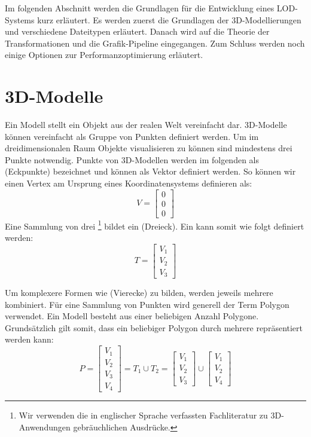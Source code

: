 
Im folgenden Abschnitt werden die Grundlagen für die Entwicklung eines LOD-Systems kurz erläutert.
Es werden zuerst die Grundlagen der 3D-Modellierungen und verschiedene Dateitypen erläutert. Danach wird auf die Theorie der Transformationen und die Grafik-Pipeline eingegangen. Zum Schluss werden noch einige Optionen zur Performanzoptimierung erläutert.

\section{3D-Modelle}
Ein Modell stellt ein Objekt aus der realen Welt vereinfacht dar.
3D-Modelle können vereinfacht als Gruppe von Punkten definiert werden.
Um im dreidimensionalen Raum Objekte visualisieren zu können sind mindestens drei Punkte notwendig.
Punkte von 3D-Modellen werden im folgenden als  (Eckpunkte) bezeichnet und können als Vektor definiert werden.
So können wir einen Vertex am Ursprung eines Koordinatensystems definieren als:
$$ V =
\begin{bmatrix}
  0 \\
  0 \\
  0
\end{bmatrix}
$$
Eine Sammlung von drei \footnote{Wir verwenden die in englischer Sprache verfassten Fachliteratur zu 3D-Anwendungen gebräuchlichen Ausdrücke.} bildet ein  (Dreieck). Ein  kann somit wie folgt definiert werden:
$$ T =
\begin{bmatrix}
  V_1 \\
  V_2 \\
  V_3
\end{bmatrix}
$$

Um komplexere Formen wie  (Vierecke) zu bilden, werden jeweils mehrere  kombiniert. Für eine Sammlung von Punkten wird generell der Term Polygon verwendet.
Ein Modell besteht aus einer beliebigen Anzahl Polygone.
Grundsätzlich gilt somit, dass ein beliebiger Polygon durch mehrere  repräsentiert werden kann:
$$ P =
\begin{bmatrix}
  V_1 \\
  V_2 \\
  V_3 \\
  V_4
\end{bmatrix}
= T_1 \cup T_2
= \begin{bmatrix}
  V_1 \\
  V_2 \\
  V_3
\end{bmatrix}
\cup
\begin{bmatrix}
  V_1 \\
  V_2 \\
  V_4
\end{bmatrix}
$$

